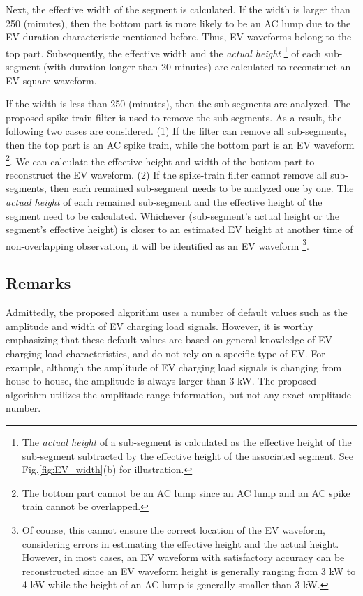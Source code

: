 \documentclass[conference]{IEEEtran}
\begin{document}
Next, the effective width of the segment is calculated. If the width is larger than 250 (minutes), then the bottom part is more likely to be an AC lump due to the EV duration characteristic mentioned before. Thus, EV waveforms belong to the top part. Subsequently, the effective width and the \emph{actual height} \footnote{The \emph{actual height} of a sub-segment is calculated as the effective height of the sub-segment subtracted by the effective height of the associated segment. See Fig.\ref{fig:EV_width}(b) for illustration.} of each sub-segment (with duration longer than 20 minutes) are calculated to reconstruct an EV square waveform.



If the width is less than 250 (minutes), then the sub-segments  are analyzed. The proposed spike-train filter is used to remove the sub-segments. As a result, the following two cases are considered. (1) If the filter can remove all sub-segments, then the top part is an AC spike train, while the bottom part is an EV waveform \footnote{The bottom part cannot be an AC lump since an AC lump and an AC spike train cannot be overlapped.}. We can calculate the effective height and width of the bottom part to reconstruct the EV waveform. (2) If the spike-train filter cannot remove all sub-segments, then each remained sub-segment needs to be analyzed one by one. The \emph{actual height} of each remained sub-segment and the effective height of the segment need to be calculated. Whichever (sub-segment's actual height or the segment's effective height) is closer to an estimated EV height at another time of non-overlapping observation, it will be identified as an EV waveform \footnote{Of course, this cannot ensure the correct location of the EV waveform, considering errors in estimating the effective height and the actual height. However, in most cases, an EV waveform with satisfactory accuracy can be reconstructed since an EV waveform height is generally ranging from 3 kW to 4 kW while the height of an AC lump is generally smaller than 3 kW.}.










\subsection{Remarks}

Admittedly, the proposed algorithm uses a number of default values such as the amplitude and width of EV charging load signals. However, it is worthy emphasizing that these default values are based on general knowledge of EV charging load characteristics, and do not rely on a specific type of EV. For example, although the amplitude of EV charging load signals is changing from house to house, the amplitude is always larger than 3 kW. The proposed algorithm utilizes the amplitude range information, but not any exact amplitude number.
\end{document}
